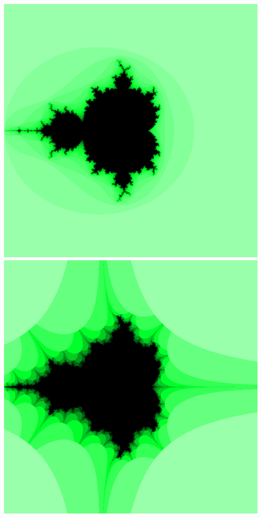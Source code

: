 \documentclass[../resume.tex]{subfiles}
\begin{document}
\includegraphics[scale=0.15]{../TAing/mandel/green_sqrt.png}
\includegraphics[scale=0.15]{../TAing/mandel/green_y.png}
\end{document}
